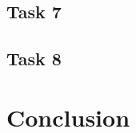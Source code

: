 \documentclass[12pt]{article}
\begin{document}
\subsection{Task 7}


\subsection{Task 8}

\section{Conclusion}






\appendix  
\clearpage
\addappheadtotoc 
\appendixpage 
\end{document}
